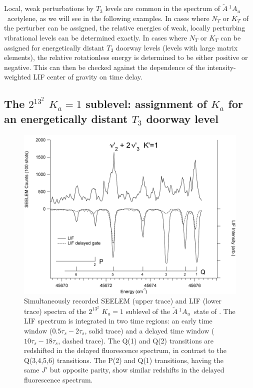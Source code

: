 \documentclass[12pt]{mitthesis}
\newcommand{\astate}{$
  \tilde{A} \: ^1\!A_u
  $}
\newcommand{\Ka}[1]{$K_a\!\!=\!#1$}
\begin{document}
Local, weak perturbations by $T_3$ levels are common in the spectrum
of \astate\ acetylene, as we will see in the following examples.  In
cases where $N_T$ or $K_T$ of the perturber can be assigned, the
relative energies of weak, locally perturbing vibrational levels can
be determined exactly.  In cases where $N_T$ or $K_T$ can be assigned
for energetically distant $T_3$ doorway levels (levels with large
matrix elements), the relative rotationless energy is determined to be
either positive or negative.  This can then be checked against the
dependence of the intensity-weighted LIF center of gravity on time
delay.

\subsection{The $2^13^2$ \Ka{1} sublevel: assignment of $K_a$ for an
  energetically distant $T_3$ doorway level}



\begin{figure}
  \caption{Simultaneously recorded SEELEM (upper trace) and LIF (lower
    trace) spectra of the $2^13^2$ \Ka{1} sublevel of the \astate\
    state of .  The LIF spectrum is integrated in two time
    regions: an early time window ($0.5\tau_s-2\tau_s$, solid trace)
    and a delayed time window ($10\tau_s-18\tau_s$, dashed trace).
    The Q(1) and Q(2) transitions are redshifted in the delayed
    fluorescence spectrum, in contrast to the Q(3,4,5,6) transitions.
    The P(2) and Q(1) transitions, having the same $J'$ but opposite
    parity, show similar redshifts in the delayed fluorescence
    spectrum.}
  \label{fig:spectrum-2132}
  \centering
  \vspace{1cm}
  \includegraphics[width=7in,angle=90]{acetylene-2132-q6q1.png}
\end{figure}
\end{document}
